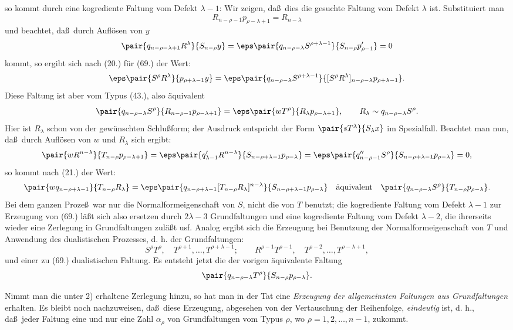 so kommt durch eine kogrediente Faltung vom Defekt $\lambda-1$:
Wir zeigen, da\ss\ dies die gesuchte Faltung vom Defekt $\lambda$ ist. Substituiert man
\[
 R_{n-\rho-1}p_{\rho-\lambda+1}=R_{n-\lambda}
\]
und beachtet, da\ss\ durch Aufl\"osen von $y$
\[
 \pair{q_{n-\rho-\lambda+1}R^\lambda}{S_{n-\rho}y}
 =\eps\pair{q_{n-\rho-\lambda}S^{\rho+\lambda-1}}{S_{n-\rho}p'_{\rho-1}}=0
\]
kommt, so ergibt sich nach (20.) f\"ur (69.) der Wert:
\[
 \eps\pair{S^\rho R^\lambda}{p_{\rho+\lambda-1}y}
 =\eps\pair{q_{n-\rho-\lambda}S^{\rho+\lambda-1}}{[S^\rho R^\lambda]_{n-\rho-\lambda}p_{\rho+\lambda-1}}.
\]
Diese Faltung ist aber vom Typus (43.), also \"aquivalent
\[
 \pair{q_{n-\rho-\lambda}S^\rho}{R_{n-\rho-1}p_{\rho-\lambda+1}}
 =\eps\pair{wT^\rho}{R_\lambda p_{\rho-\lambda+1}},
 \qquad R_\lambda\sim q_{n-\rho-\lambda}S^\rho.
\]
Hier ist $R_\lambda$ schon von der gew\"unschten Schlu\ss{}form; der Ausdruck entspricht der Form $\pair{sT^\lambda}{S_\lambda x}$ im Spezialfall. Beachtet man nun, da\ss\ durch Aufl\"osen von $w$ und $R_\lambda$ sich ergibt:
\[
 \pair{wR^{n-\lambda}}{T_{n-\rho}p_{\rho-\lambda+1}}
 =\eps\pair{q'_{\lambda-1}R^{n-\lambda}}{S_{n-\rho+\lambda-1}p_{\rho-\lambda}}
 =\eps\pair{q''_{n-\rho-1}S^\rho}{S_{n-\rho+\lambda-1}p_{\rho-\lambda}}=0,
\]
so kommt nach (21.) der Wert:
\[
 \pair{wq_{n-\rho+\lambda-1}}{T_{n-\rho}R_\lambda}
 =\eps\pair{q_{n-\rho+\lambda-1}[T_{n-\rho}R_\lambda]^{n-\lambda}}{S_{n-\rho+\lambda-1}p_{\rho-\lambda}}
 \quad\text{\"aquivalent}\quad
 \pair{q_{n-\rho-\lambda}S^\rho}{T_{n-\rho}p_{\rho-\lambda}}.
\]
Bei dem ganzen Proze\ss\ war nur die Normalformeigenschaft von $S$, nicht die von $T$ benutzt; die kogrediente Faltung vom Defekt $\lambda-1$ zur Erzeugung von (69.) l\"a\ss t sich also ersetzen durch $2\lambda-3$ Grundfaltungen und eine kogrediente Faltung vom Defekt $\lambda-2$, die ihrerseits wieder eine Zerlegung in Grundfaltungen zul\"a\ss t usf. Analog ergibt sich die Erzeugung bei Benutzung der Normalformeigenschaft von $T$ und Anwendung des dualistischen Prozesses, d. h. der Grundfaltungen:
\[
 S^\rho T^\rho,\quad T^{\rho+1},\ldots,T^{\rho+\lambda-1};
 \qquad R^{\rho-1}T^{\rho-1},\quad T^{\rho-2},\ldots,T^{\rho-\lambda+1},
\]
und einer zu (69.) dualistischen Faltung. Es entsteht jetzt die der vorigen \"aquivalente Faltung
\[
 \pair{q_{n-\rho-\lambda}T^\rho}{S_{n-\rho}p_{\rho-\lambda}}.
\]

Nimmt man die unter 2) erhaltene Zerlegung hinzu, so hat man in der Tat eine \emph{Erzeugung der allgemeinsten Faltungen aus Grundfaltungen} erhalten. Es bleibt noch nachzuweisen, da\ss\ diese Erzeugung, abgesehen von der Vertauschung der Reihenfolge, \emph{eindeutig} ist, d. h., da\ss\ jeder Faltung eine und nur eine Zahl $\alpha_\rho$ von Grundfaltungen vom Typus $\rho$, wo $\rho=1,2,\ldots,n-1$, zukommt.

